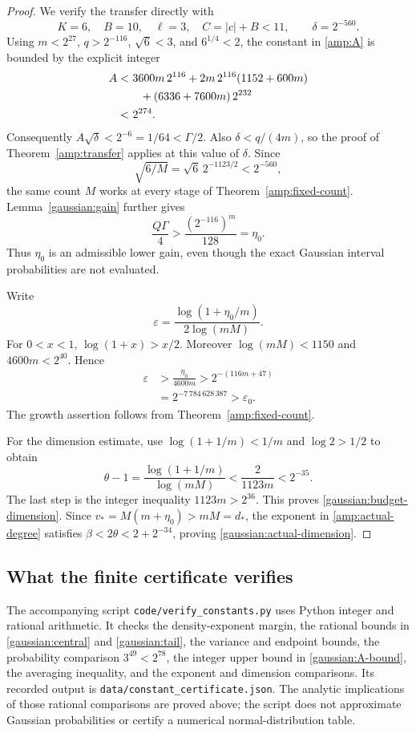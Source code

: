 \begin{proof}
We verify the transfer directly with
\[
 K=6,\quad B=10,\quad\ell=3,\quad C=|c|+B<11,
 \qquad\delta=2^{-560}.
\]
Using $m<2^{27}$, $q>2^{-116}$, $\sqrt6<3$, and
$6^{1/4}<2$, the constant in \eqref{amp:A} is bounded by the
explicit integer
\begin{align}
 A<&\ 3600m\,2^{116}
     +2m\,2^{116}(1152+600m)\notag\\
    &\quad +(6336+7600m)\,2^{232}\notag\\
   <&\ 2^{274}.
 \label{gaussian:A-bound}
\end{align}
Consequently $A\sqrt\delta<2^{-6}=1/64<\Gamma/2$.
Also $\delta<q/(4m)$, so the proof of
Theorem~\ref{amp:transfer} applies at this value of $\delta$.
Since
\[
 \sqrt{6/M}=\sqrt6\,2^{-1123/2}<2^{-560},
\]
the same count $M$ works at every stage of
Theorem~\ref{amp:fixed-count}.  Lemma~\ref{gaussian:gain} further gives
\[
 \frac{Q\Gamma}{4}>
 \frac{(2^{-116})^m}{128}=\eta_0.
\]
Thus $\eta_0$ is an admissible lower gain, even though the exact
Gaussian interval probabilities are not evaluated.

Write
\[
 \varepsilon=
 \frac{\log(1+\eta_0/m)}{2\log(mM)}.
\]
For $0<x<1$, $\log(1+x)>x/2$.  Moreover
$\log(mM)<1150$ and $4600m<2^{40}$.  Hence
\begin{equation}
 \begin{aligned}
 \varepsilon&>\frac{\eta_0}{4600m}>2^{-(116m+47)}\\
             &=2^{-7\,784\,628\,387}>\varepsilon_0.
 \end{aligned}
 \label{gaussian:epsilon}
\end{equation}
The growth assertion follows from Theorem~\ref{amp:fixed-count}.

For the dimension estimate, use $\log(1+1/m)<1/m$ and
$\log2>1/2$ to obtain
\[
 \theta-1
 =\frac{\log(1+1/m)}{\log(mM)}
 <\frac2{1123m}<2^{-35}.
\]
The last step is the integer inequality $1123m>2^{36}$.
This proves \eqref{gaussian:budget-dimension}.
Since $v_*=M(m+\eta_0)>mM=d_*$, the exponent in
\eqref{amp:actual-degree} satisfies
$\beta<2\theta<2+2^{-34}$, proving
\eqref{gaussian:actual-dimension}.
\end{proof}

\subsection{What the finite certificate verifies}

The accompanying script \texttt{code/verify\_constants.py} uses Python
integer and rational arithmetic.  It checks the density-exponent margin,
the rational bounds in \eqref{gaussian:central} and
\eqref{gaussian:tail}, the variance and endpoint bounds, the probability
comparison $3^{49}<2^{78}$, the integer upper bound in
\eqref{gaussian:A-bound}, the averaging inequality, and the exponent and
dimension comparisons.  Its recorded output is
\texttt{data/constant\_certificate.json}.  The analytic implications of
those rational comparisons are proved above; the script does not approximate
Gaussian probabilities or certify a numerical normal-distribution table.

